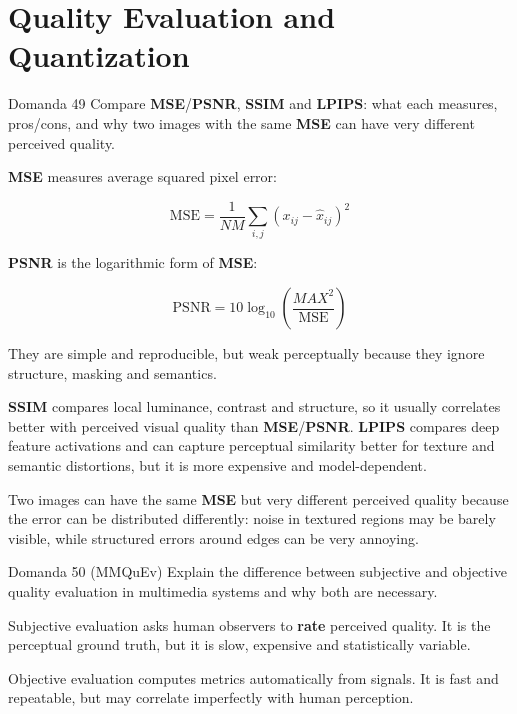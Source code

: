 \section{Quality Evaluation and Quantization}




\begin{questionbox}{Domanda 49}
Compare \textbf{MSE}/\textbf{PSNR}, \textbf{SSIM} and \textbf{LPIPS}: what each measures, pros/cons, and why two images with the same \textbf{MSE} can have very different perceived quality.
\end{questionbox}


\textbf{MSE} measures average squared pixel error:


$$
\text{MSE}=\frac{1}{NM}\sum_{i,j}(x_{ij}-\hat{x}_{ij})^2
$$


\textbf{PSNR} is the logarithmic form of \textbf{MSE}:


$$
\text{PSNR}=10\log_{10}\left(\frac{MAX^2}{\text{MSE}}\right)
$$


They are simple and reproducible, but weak perceptually because they ignore structure, masking and semantics.

\textbf{SSIM} compares local luminance, contrast and structure, so it usually correlates better with perceived visual quality than \textbf{MSE}/\textbf{PSNR}. \textbf{LPIPS} compares deep feature activations and can capture perceptual similarity better for texture and semantic distortions, but it is more expensive and model-dependent.

Two images can have the same \textbf{MSE} but very different perceived quality because the error can be distributed differently: noise in textured regions may be barely visible, while structured errors around edges can be very annoying.



\begin{questionbox}{Domanda 50}
(MMQuEv) Explain the difference between subjective and objective quality evaluation in multimedia systems and why both are necessary.
\end{questionbox}


Subjective evaluation asks human observers to \textbf{rate} perceived quality. It is the perceptual ground truth, but it is slow, expensive and statistically variable.

Objective evaluation computes metrics automatically from signals. It is fast and repeatable, but may correlate imperfectly with human perception.

